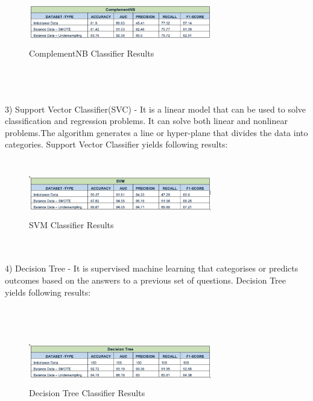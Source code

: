\documentclass[a4paper, 10pt, conference]{ieeeconf}      %
\begin{document}
\begin{figure}[htp]
    \centering
    \includegraphics[width=8cm,height=2cm]{Images/ComplementNB.png}
    \caption{ComplementNB Classifier Results}
    \label{fig:ComplementNB}
\end{figure}
\\\
\\\
\\3) Support Vector Classifier(SVC) - It is a linear model that can be used to solve classification and regression problems. It can solve both linear and nonlinear problems.The algorithm generates a line or hyper-plane that divides the data into categories.
 Support Vector Classifier yields following results:
\\\
\begin{figure}[htp]
    \centering
    \includegraphics[width=8cm,height=2cm]{Images/svm.png}
    \caption{SVM Classifier Results}
    \label{fig:svm}
\end{figure}
\\\
\\4) Decision Tree - It is supervised machine learning that categorises or predicts outcomes based on the answers to a previous set of questions.
Decision Tree yields following results:

\\\
\begin{figure}[htp]
    \centering
    \includegraphics[width=8cm,height=2cm]{Images/decisionTree.png}
    \caption{Decision Tree Classifier Results}
    \label{fig:decisionTree}
\end{figure}
\\
\end{document}
